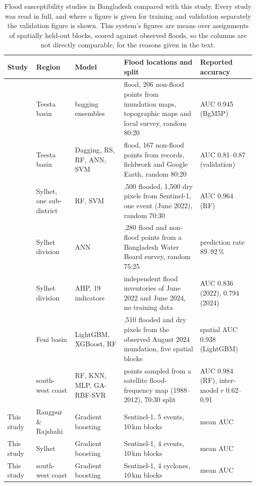 \documentclass[10pt,a4paper,twocolumn]{article}
\begin{document}
\begin{table}[tp]
\centering
\small
\begin{tabularx}{\textwidth}{>{\raggedright\arraybackslash}p{2.4cm}>{\raggedright\arraybackslash}p{2.1cm}>{\raggedright\arraybackslash}p{2.5cm}>{\raggedright\arraybackslash}X>{\raggedright\arraybackslash}p{2.2cm}}
\toprule
Study & Region & Model & Flood locations and split & Reported accuracy \\
\midrule
\citet{talukdar2020} & Teesta basin & bagging ensembles & 207 flood, 206 non-flood points from inundation maps, topographic maps and local survey, random 80:20 & AUC 0.945 (BgM5P) \\
\citet{islam2021} & Teesta basin & Dagging, RS, RF, ANN, SVM & 167 flood, 167 non-flood points from records, fieldwork and Google Earth, random 80:20 & AUC 0.81--0.87 (validation) \\
\citet{islamr2024} & Sylhet, one sub-district & RF, SVM & 1,500 flooded, 1,500 dry pixels from Sentinel-1, one event (June 2022), random 70:30 & AUC 0.964 (RF) \\
\citet{rudra2023} & Sylhet division & ANN & 1,280 flood and non-flood points from a Bangladesh Water Board survey, random 75:25 & prediction rate 89--92\,\% \\
\citet{swarup2026} & Sylhet division & AHP, 19 indicators & independent flood inventories of June 2022 and June 2024, no training data & AUC 0.836 (2022), 0.794 (2024) \\
\citet{diptho2026} & Feni basin & LightGBM, XGBoost, RF & 1,510 flooded and dry pixels from the observed August 2024 inundation, five spatial blocks & spatial AUC 0.938 (LightGBM) \\
\citet{adnan2023} & south-west coast & RF, KNN, MLP, GA-RBF-SVR & 965 points sampled from a satellite flood-frequency map (1988--2012), 70:30 split & AUC 0.984 (RF), inter-model $r$ 0.62--0.91 \\
\midrule
This study & Rangpur \& Rajshahi & Gradient boosting & Sentinel-1, 5 events, 10\,km blocks & mean AUC \RRBenchBoostingAUC{} \\
This study & Sylhet & Gradient boosting & Sentinel-1, 4 events, 10\,km blocks & mean AUC \SylhetBenchBoostingAUC{} \\
This study & south-west coast & Gradient boosting & Sentinel-1, 4 cyclones, 10\,km blocks & mean AUC \CoastalBenchBoostingAUC{} \\
\bottomrule
\end{tabularx}
\caption{Flood susceptibility studies in Bangladesh compared with this study. Every study was read in full, and where a figure is given for training and validation separately the validation figure is shown. This system's figures are means over \RRBenchSeeds{} assignments of spatially held-out blocks, scored against observed floods, so the columns are not directly comparable, for the reasons given in the text.}
\label{tab:litflood}
\end{table}
\end{document}
